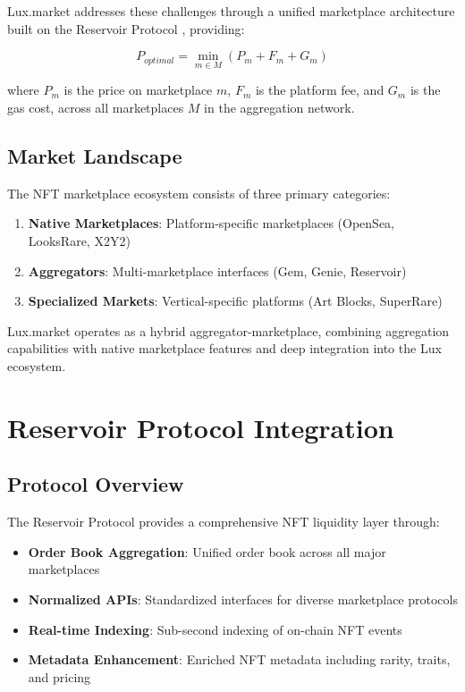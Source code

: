 \documentclass[11pt,a4paper]{article}
\begin{document}
Lux.market addresses these challenges through a unified marketplace architecture built on the Reservoir Protocol \cite{reservoir2023}, providing:

\begin{equation}
P_{optimal} = \min_{m \in M} \left( P_m + F_m + G_m \right)
\end{equation}

where $P_m$ is the price on marketplace $m$, $F_m$ is the platform fee, and $G_m$ is the gas cost, across all marketplaces $M$ in the aggregation network.

\subsection{Market Landscape}

The NFT marketplace ecosystem consists of three primary categories:

\begin{enumerate}
\item \textbf{Native Marketplaces}: Platform-specific marketplaces (OpenSea, LooksRare, X2Y2)
\item \textbf{Aggregators}: Multi-marketplace interfaces (Gem, Genie, Reservoir)
\item \textbf{Specialized Markets}: Vertical-specific platforms (Art Blocks, SuperRare)
\end{enumerate}

Lux.market operates as a hybrid aggregator-marketplace, combining aggregation capabilities with native marketplace features and deep integration into the Lux ecosystem.

\section{Reservoir Protocol Integration}

\subsection{Protocol Overview}

The Reservoir Protocol provides a comprehensive NFT liquidity layer through:

\begin{itemize}
\item \textbf{Order Book Aggregation}: Unified order book across all major marketplaces
\item \textbf{Normalized APIs}: Standardized interfaces for diverse marketplace protocols
\item \textbf{Real-time Indexing}: Sub-second indexing of on-chain NFT events
\item \textbf{Metadata Enhancement}: Enriched NFT metadata including rarity, traits, and pricing
\end{itemize}
\end{document}
